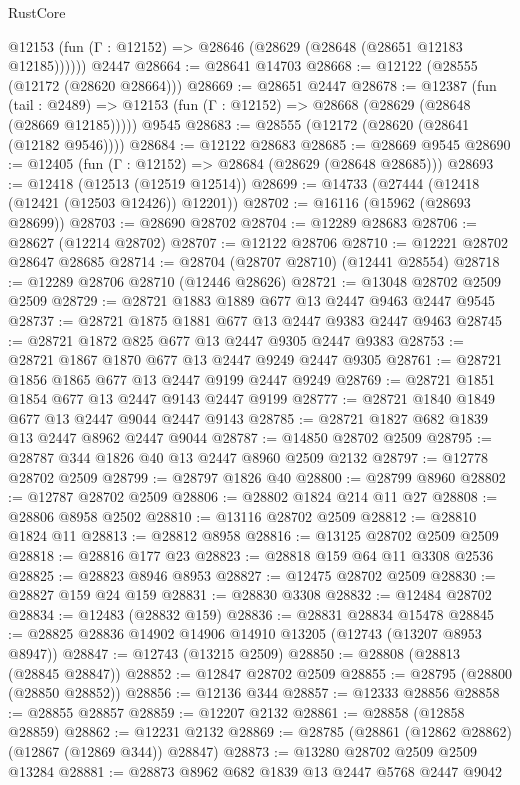 \begin{lexlean}{RustCore}
\begin{coremodule}
      @12153 (fun (Γ : @12152) => @28646 (@28629 (@28648 (@28651 @12183 @12185))))))
    @2447
@28664 := @28641 @14703
@28668 := @12122 (@28555 (@12172 (@28620 @28664)))
@28669 := @28651 @2447
@28678 := @12387
    (fun (tail : @2489) => @12153 (fun (Γ : @12152) => @28668 (@28629 (@28648 (@28669 @12185)))))
    @9545
@28683 := @28555 (@12172 (@28620 (@28641 (@12182 @9546))))
@28684 := @12122 @28683
@28685 := @28669 @9545
@28690 := @12405 (fun (Γ : @12152) => @28684 (@28629 (@28648 @28685)))
@28693 := @12418 (@12513 (@12519 @12514))
@28699 := @14733 (@27444 (@12418 (@12421 (@12503 @12426)) @12201))
@28702 := @16116 (@15962 (@28693 @28699))
@28703 := @28690 @28702
@28704 := @12289 @28683
@28706 := @28627 (@12214 @28702)
@28707 := @12122 @28706
@28710 := @12221 @28702 @28647 @28685
@28714 := @28704 (@28707 @28710) (@12441 @28554)
@28718 := @12289 @28706 @28710 (@12446 @28626)
@28721 := @13048 @28702 @2509 @2509
@28729 := @28721 @1883 @1889 @677 @13 @2447 @9463 @2447 @9545
@28737 := @28721 @1875 @1881 @677 @13 @2447 @9383 @2447 @9463
@28745 := @28721 @1872 @825 @677 @13 @2447 @9305 @2447 @9383
@28753 := @28721 @1867 @1870 @677 @13 @2447 @9249 @2447 @9305
@28761 := @28721 @1856 @1865 @677 @13 @2447 @9199 @2447 @9249
@28769 := @28721 @1851 @1854 @677 @13 @2447 @9143 @2447 @9199
@28777 := @28721 @1840 @1849 @677 @13 @2447 @9044 @2447 @9143
@28785 := @28721 @1827 @682 @1839 @13 @2447 @8962 @2447 @9044
@28787 := @14850 @28702 @2509
@28795 := @28787 @344 @1826 @40 @13 @2447 @8960 @2509 @2132
@28797 := @12778 @28702 @2509
@28799 := @28797 @1826 @40
@28800 := @28799 @8960
@28802 := @12787 @28702 @2509
@28806 := @28802 @1824 @214 @11 @27
@28808 := @28806 @8958 @2502
@28810 := @13116 @28702 @2509
@28812 := @28810 @1824 @11
@28813 := @28812 @8958
@28816 := @13125 @28702 @2509 @2509
@28818 := @28816 @177 @23
@28823 := @28818 @159 @64 @11 @3308 @2536
@28825 := @28823 @8946 @8953
@28827 := @12475 @28702 @2509
@28830 := @28827 @159 @24 @159
@28831 := @28830 @3308
@28832 := @12484 @28702
@28834 := @12483 (@28832 @159)
@28836 := @28831 @28834 @15478
@28845 := @28825 @28836 @14902 @14906 @14910 @13205 (@12743 (@13207 @8953 @8947))
@28847 := @12743 (@13215 @2509)
@28850 := @28808 (@28813 (@28845 @28847))
@28852 := @12847 @28702 @2509
@28855 := @28795 (@28800 (@28850 @28852))
@28856 := @12136 @344
@28857 := @12333 @28856
@28858 := @28855 @28857
@28859 := @12207 @2132
@28861 := @28858 (@12858 @28859)
@28862 := @12231 @2132
@28869 := @28785 (@28861 (@12862 @28862) (@12867 (@12869 @344)) @28847)
@28873 := @13280 @28702 @2509 @2509 @13284
@28881 := @28873 @8962 @682 @1839 @13 @2447 @5768 @2447 @9042

\end{coremodule}
\end{lexlean}
